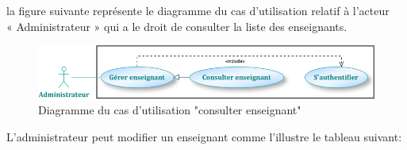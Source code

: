 \documentclass[12 pt ]{report}
\begin{document}
la figure suivante représente le diagramme du cas d’utilisation  relatif à l’acteur \\« Administrateur » qui a le droit de consulter la liste des enseignants.
\begin{figure}[h]
 \begin{center}
\includegraphics[width=13 cm ,height=2 cm]{a4.PNG}
\caption{Diagramme du cas d’utilisation "consulter enseignant"}
\end{center}
\end{figure}
\newpage
L'administrateur peut modifier un enseignant comme l'illustre le tableau suivant: 
\end{document}
